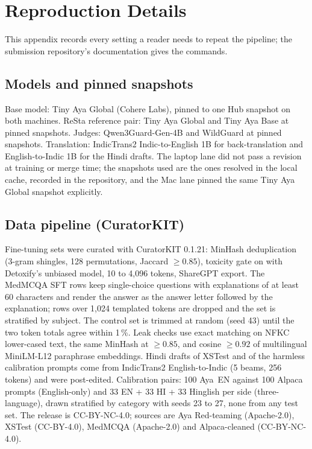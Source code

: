 \section{Reproduction Details}\label{app:repro}
This appendix records every setting a reader needs to repeat the pipeline; the submission repository's documentation gives the commands.

\subsection{Models and pinned snapshots}
Base model: Tiny Aya Global (Cohere Labs), pinned to one Hub snapshot on both machines. ReSta reference pair: Tiny Aya Global and Tiny Aya Base at pinned snapshots. Judges: Qwen3Guard-Gen-4B and WildGuard at pinned snapshots. Translation: IndicTrans2 Indic-to-English 1B for back-translation and English-to-Indic 1B for the Hindi drafts. The laptop lane did not pass a revision at training or merge time; the snapshots used are the ones resolved in the local cache, recorded in the repository, and the Mac lane pinned the same Tiny Aya Global snapshot explicitly.

\subsection{Data pipeline (CuratorKIT)}
Fine-tuning sets were curated with CuratorKIT 0.1.21: MinHash deduplication (3-gram shingles, 128 permutations, Jaccard $\ge 0.85$), toxicity gate on with Detoxify's unbiased model, 10 to 4,096 tokens, ShareGPT export. The MedMCQA SFT rows keep single-choice questions with explanations of at least 60 characters and render the answer as the answer letter followed by the explanation; rows over 1,024 templated tokens are dropped and the set is stratified by subject. The control set is trimmed at random (seed 43) until the two token totals agree within 1\,\%. Leak checks use exact matching on NFKC lower-cased text, the same MinHash at $\ge 0.85$, and cosine $\ge 0.92$ of multilingual MiniLM-L12 paraphrase embeddings. Hindi drafts of XSTest and of the harmless calibration prompts come from IndicTrans2 English-to-Indic (5 beams, 256 tokens) and were post-edited. Calibration pairs: 100 Aya~EN against 100 Alpaca prompts (English-only) and 33 EN + 33 HI + 33 Hinglish per side (three-language), drawn stratified by category with seeds 23 to 27, none from any test set. The release is CC-BY-NC-4.0; sources are Aya Red-teaming (Apache-2.0), XSTest (CC-BY-4.0), MedMCQA (Apache-2.0) and Alpaca-cleaned (CC-BY-NC-4.0).

